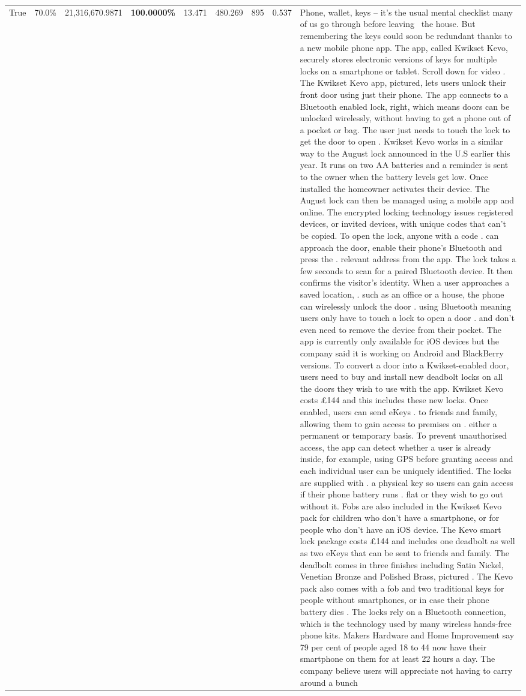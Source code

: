 \begin{table}[H]
\begin{tabular}{lllrlllll}
True & 70.0\% & 21,316,670.9871 & \bfseries \color{red} 100.0000\% & 13.471 & 480.269 & 895 & 0.537 & Phone, wallet, keys – it’s the usual mental checklist many of us go through before leaving  the house. But remembering the keys could soon be redundant thanks to a new mobile phone app. The app, called Kwikset Kevo, securely stores electronic versions of keys for multiple locks on a smartphone or tablet. Scroll down for video . The Kwikset Kevo app, pictured, lets users unlock their front door using just their phone. The app connects to a Bluetooth enabled lock, right, which means doors can be unlocked wirelessly, without having to get a phone out of a pocket or bag. The user just needs to touch the lock to get the door to open . Kwikset Kevo works in a similar way to the August lock announced in the U.S earlier this year. It runs on two AA batteries and a reminder is sent to the owner when the battery levels get low. Once installed the homeowner activates their device. The August lock can then be managed using a mobile app and online. The encrypted locking technology issues registered devices, or invited devices, with unique codes that can't be copied. To open the lock, anyone with a code . can approach the door, enable their phone's Bluetooth and press the . relevant address from the app. The lock takes a few seconds to scan for a paired Bluetooth device. It then confirms the visitor's identity. When a user approaches a saved location, . such as an office or a house, the phone can wirelessly unlock the door . using Bluetooth meaning users only have to touch a lock to open a door . and don't even need to remove the device from their pocket. The app is currently only available for iOS devices but the company said it is working on Android and BlackBerry versions. To convert a door into a Kwikset-enabled door, users need to buy and install new deadbolt locks on all the doors they wish to use with the app. Kwikset Kevo costs £144 and this includes these new locks. Once enabled, users can send eKeys . to friends and family, allowing them to gain access to premises on . either a permanent or temporary basis. To prevent unauthorised access, the app can detect whether a user is already inside, for example, using GPS before granting access and each individual user can be uniquely identified. The locks are supplied with . a physical key so users can gain access if their phone battery runs . flat or they wish to go out without it. Fobs are also included in the Kwikset Kevo pack for children who don't have a smartphone, or for people who don't have an iOS device. The Kevo smart lock package costs £144 and includes one deadbolt as well as two eKeys that can be sent to friends and family. The deadbolt comes in three finishes including Satin Nickel, Venetian Bronze and Polished Brass, pictured . The Kevo pack also comes with a fob and two traditional keys for people without smartphones, or in case their phone battery dies . The locks rely on a Bluetooth connection, which is the technology used by many wireless hands-free phone kits. Makers Hardware and Home Improvement say 79 per cent of people aged 18 to 44 now have their smartphone on them for at least 22 hours a day. The company believe users will appreciate not having to carry around a bunch 
\end{tabular}
\end{table}
